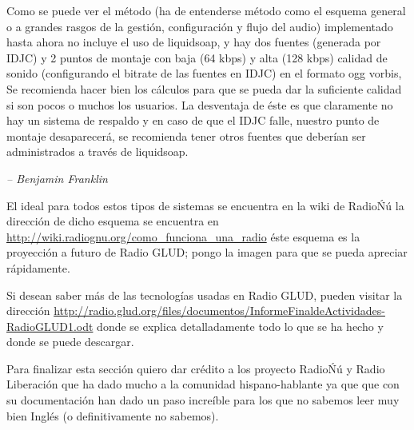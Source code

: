 \begin{multicols}{2}

Como se puede ver el método (ha de entenderse método como el esquema general o a grandes rasgos de la gestión, configuración y flujo del audio) implementado hasta ahora no incluye el uso de liquidsoap, y hay dos fuentes (generada por IDJC) y 2 puntos de montaje con baja (64 kbps) y alta (128 kbps) calidad de sonido (configurando el bitrate de las fuentes en IDJC) en el formato ogg vorbis, Se recomienda hacer bien los cálculos para que se pueda dar la suficiente calidad si son pocos o muchos los usuarios.\cite{ref5} La desventaja de éste es que claramente no hay un sistema de respaldo y en caso de que el IDJC falle, nuestro punto de montaje desaparecerá, se recomienda tener otros fuentes que deberían ser administrados a través de liquidsoap.

\begin{entradilla} %
{\em {\color{introcolor}{``Aquel que sacrifica la libertad por seguridad, no merece ninguna de las dos''}} -- Benjamin Franklin}
\end{entradilla}
El ideal para todos estos tipos de sistemas se encuentra en la wiki de RadioŃú la dirección de dicho esquema se encuentra en \url{http://wiki.radiognu.org/como_funciona_una_radio} éste esquema es la proyección a futuro de Radio GLUD; pongo la imagen para que se pueda apreciar rápidamente.

\begin{center}
\end{center}

Si desean saber más de las tecnologías usadas en Radio GLUD, pueden visitar la dirección \url{http://radio.glud.org/files/documentos/InformeFinaldeActividades-RadioGLUD1.odt} donde se explica detalladamente todo lo que se ha hecho y donde se puede descargar.

Para finalizar esta sección quiero dar crédito a los proyecto RadioŃú y Radio Liberación que ha dado mucho a la comunidad hispano-hablante ya que que con su documentación han dado un paso increíble para los que no sabemos leer muy bien Inglés (o definitivamente no sabemos).



\end{multicols}
